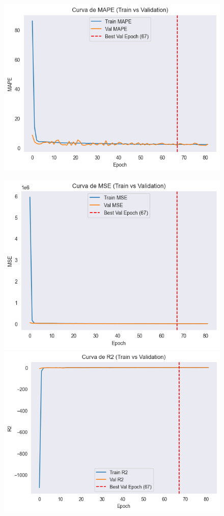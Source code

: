 \begin{figure}[H]
\begin{minipage}{0.48\textwidth}
		\includegraphics[width=\linewidth]{includes/cap5/graphs/sid1_mlp_mape.png}
	\end{minipage}
	\hfill
	\begin{minipage}{0.48\textwidth}
		\centering
		\includegraphics[width=\linewidth]{includes/cap5/graphs/sid1_mlp_mse.png}
		\vspace{0.2cm}
		\includegraphics[width=\linewidth]{includes/cap5/graphs/sid1_mlp_r2.png}

\end{minipage}
\end{figure}
